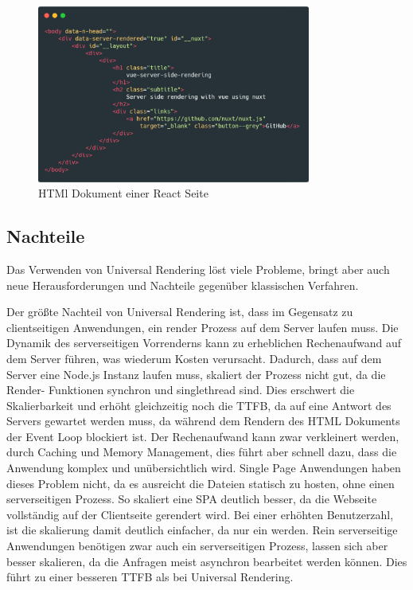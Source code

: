 \documentclass[runningheads]{llncs}
\begin{document}
\begin{figure}[h]
  \centering
  \includegraphics[width=9cm]{images/nuxt-body-first}
  \caption{HTMl Dokument einer React Seite}
\end{figure}

\subsection{Nachteile}
\label{subsec:Nachteile}
Das Verwenden von Universal Rendering löst viele Probleme, 
bringt aber auch neue Herausforderungen und 
Nachteile gegenüber klassischen Verfahren.

Der größte Nachteil von Universal Rendering ist, 
dass im Gegensatz zu clientseitigen Anwendungen, 
ein render Prozess auf dem Server laufen muss. 
Die Dynamik des serverseitigen Vorrenderns 
kann zu erheblichen Rechenaufwand auf dem Server führen, 
was wiederum Kosten verursacht. 
Dadurch, dass auf dem Server eine Node.js Instanz laufen muss, 
skaliert der Prozess nicht gut, 
da die Render- Funktionen synchron und singlethread sind. 
Dies erschwert die Skalierbarkeit und erhöht gleichzeitig noch die TTFB, 
da auf eine Antwort des Servers gewartet werden muss, 
da während dem Rendern des HTML Dokuments der Event Loop blockiert ist. 
Der Rechenaufwand kann zwar verkleinert werden, 
durch Caching und Memory Management, 
dies führt aber schnell dazu, 
dass die Anwendung komplex und unübersichtlich wird. 
Single Page Anwendungen haben dieses Problem nicht, 
da es ausreicht die Dateien statisch zu hosten, 
ohne einen serverseitigen Prozess. 
So skaliert eine SPA deutlich besser, 
da die Webseite vollständig auf der Clientseite gerendert wird.  
Bei einer erhöhten Benutzerzahl, 
ist die skalierung damit deutlich einfacher, 
da nur ein werden. 
Rein serverseitige Anwendungen benötigen zwar auch ein serverseitigen Prozess, 
lassen sich aber besser skalieren, 
da die Anfragen meist asynchron bearbeitet werden können. 
Dies führt zu einer besseren TTFB als bei Universal Rendering.
\end{document}
